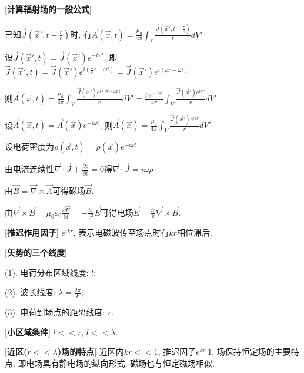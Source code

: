 [\textbf{计算辐射场的一般公式}]\par
\qquad 已知$\vec J(\vec x', t-\frac{r}{c})$时, 有$\vec A(\vec x,t)=\frac{\mu_0}{4\pi}\int_V\frac{\vec J(\vec x', t-\frac{r}{c})}{r}dV'$\par
\qquad 设$\vec J(\vec x',t)=\vec J(\vec x')e^{-i\omega t}$, 即$\vec J(\vec x',t)=\vec J(\vec x')e^{i(\frac{\omega}{c}r-\omega t)}=\vec J(\vec x')e^{i(kr-\omega t)}$\par
\qquad \quad 则$\vec A(\vec x,t)=\frac{\mu_0}{4\pi}\int_V\frac{\vec J(\vec x')e^{i(kr-\omega t)}}{r}dV'=\frac{\mu_0e^{-i\omega t}}{4\pi}\int_V\frac{\vec J(\vec x')e^{ikr}}{r}dV'$\par
\qquad 设$\vec A(\vec x,t)=\vec A(\vec x)e^{-i\omega t}$, 则$\vec A(\vec x)=\frac{\mu_0}{4\pi}\int_V\frac{\vec J(\vec x')e^{ikr}}{r}dV'$\par
\qquad 设电荷密度为$\rho(\vec x,t)=\rho(\vec x)e^{-i\omega t}$\par
\qquad 由电流连续性$\vec\nabla\cdot\vec J+\frac{\partial \rho}{\partial t}=0$得$\vec\nabla\cdot\vec J=i\omega\rho$\par
\qquad 由$\vec B=\vec\nabla\times\vec A$可得磁场$\vec B$.\par
\qquad 由$\vec\nabla\times\vec B=\mu_0\varepsilon_0\frac{\partial\vec E}{\partial t}=-\frac{i\omega}{c^2}\vec E$可得电场$\vec E=\frac{ic}{k}\vec\nabla\times\vec B$.\par

[\textbf{推迟作用因子}] $e^{ikr}$, 表示电磁波传至场点时有$kr$相位滞后.\par

[\textbf{矢势的三个线度}]\par
\qquad (1). 电荷分布区域线度: $l$;\par
\qquad (2). 波长线度: $\lambda=\frac{2\pi}{k}$;\par
\qquad (3). 电荷到场点的距离线度: $r$.\par

[\textbf{小区域条件}] $l << r$, $l<<\lambda$.\par

[\textbf{近区($r<<\lambda$)场的特点}] 近区内$kr<<1$, 推迟因子$e^{kr}~1$, 场保持恒定场的主要特点. 即电场具有静电场的纵向形式, 磁场也与恒定磁场相似.\par

